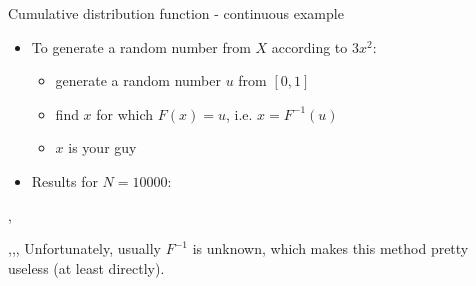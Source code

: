 \begin{slide}[toc=]{Cumulative distribution function - continuous example}
\null\vfill

 \begin{itemize}
  \item To generate a random number from $X$ according to $3x^2$:
  \begin{itemize}
    \item generate a random number $u$ from $[0, 1]$
    \item find $x$ for which $F (x) = u$, i.e. $x = F^{-1}(u)$
    \item $x$ is your guy
  \end{itemize}
  \item Results for $N = 10000$:
 \end{itemize}
  \sep
 \twocolumn
 {
  
 }
 {
  \sep\sep\sep
  Unfortunately, usually $F^{-1}$ is unknown, which makes this method pretty useless (at least directly).
 }
\vfill\null
\end{slide}
